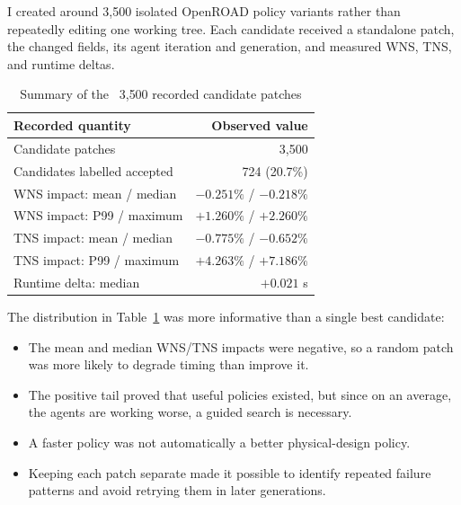 \documentclass[10pt, conference]{IEEEtran}
\begin{document}
I created around 3{,}500 isolated OpenROAD policy variants rather than repeatedly editing one working tree. Each candidate received a standalone patch, the changed fields, its agent iteration and generation, and measured WNS, TNS, and runtime deltas.

\begin{table}[t]
\centering
\caption{Summary of the ~3{,}500 recorded candidate patches}
\label{tab:sweep_outcomes}
\footnotesize
\begin{tabular}{@{}lr@{}}
\toprule
\textbf{Recorded quantity} & \textbf{Observed value} \\
\midrule
Candidate patches & ~3{,}500 \\
Candidates labelled accepted & 724 (20.7\%) \\
WNS impact: mean / median & $-0.251\%$ / $-0.218\%$ \\
WNS impact: P99 / maximum & $+1.260\%$ / $+2.260\%$ \\
TNS impact: mean / median & $-0.775\%$ / $-0.652\%$ \\
TNS impact: P99 / maximum & $+4.263\%$ / $+7.186\%$ \\
Runtime delta: median & $+0.021$ s \\
\bottomrule
\end{tabular}
\end{table}

The distribution in Table~\ref{tab:sweep_outcomes} was more informative than a single best candidate:
\begin{itemize}
  \item The mean and median WNS/TNS impacts were negative, so a random patch was more likely to degrade timing than improve it.
  \item The positive tail proved that useful policies existed, but since on an average, the agents are working worse, a guided search is necessary.
  \item A faster policy was not automatically a better physical-design policy.
  \item Keeping each patch separate made it possible to identify repeated failure patterns and avoid retrying them in later generations.
\end{itemize}
\end{document}
